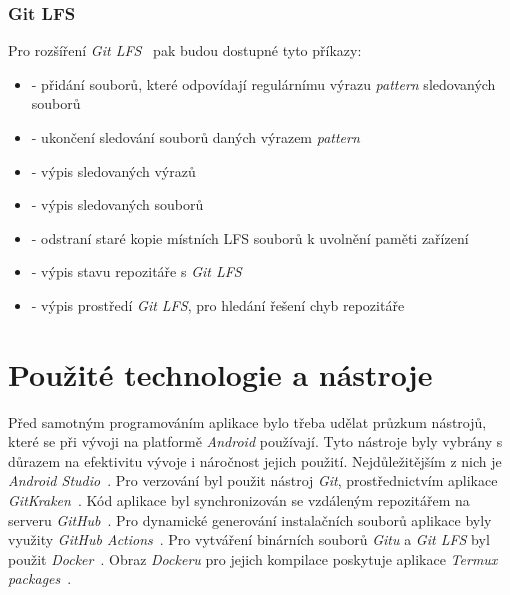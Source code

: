         \subsubsection{Git LFS}
        Pro rozšíření \emph{Git LFS}~ pak budou dostupné tyto příkazy:
        \begin{itemize}
            \item \textbf{} - přidání souborů, které odpovídají regulárnímu výrazu \emph{pattern} sledovaných souborů
            \item \textbf{} - ukončení sledování souborů daných výrazem \emph{pattern}
            \item \textbf{} - výpis sledovaných výrazů
            \item \textbf{} - výpis sledovaných souborů
            \item \textbf{} - odstraní staré kopie místních LFS souborů k uvolnění paměti zařízení
            \item \textbf{} - výpis stavu repozitáře s \emph{Git LFS}
            \item \textbf{} - výpis prostředí \emph{Git LFS}, pro hledání řešení chyb repozitáře
        \end{itemize}
    
\section{Použité technologie a nástroje}
Před samotným programováním aplikace bylo třeba udělat průzkum nástrojů, které se při vývoji na platformě \emph{Android} používají. Tyto nástroje byly vybrány s důrazem na efektivitu vývoje i náročnost jejich použití. Nejdůležitějším z nich je \emph{Android Studio}~. Pro verzování byl použit nástroj \emph{Git}, prostřednictvím aplikace \emph{GitKraken}~. Kód aplikace byl synchronizován se vzdáleným repozitářem na serveru \emph{GitHub}~. Pro dynamické generování instalačních souborů aplikace byly využity \emph{GitHub Actions}~. Pro vytváření binárních souborů \emph{Gitu} a \emph{Git LFS} byl použit \emph{Docker}~. Obraz \emph{Dockeru} pro jejich kompilace poskytuje aplikace \emph{Termux packages}~\label{termux_packages}.

